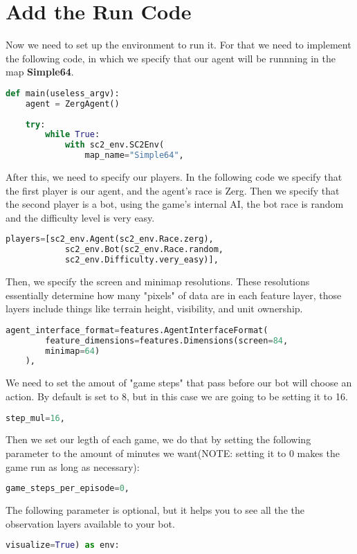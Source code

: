 \documentclass[11pt]{report}            %
\begin{document}
\section{Add the Run Code}
Now we need to set up the environment to run it. For that we need to implement the following code, in which we specify that our agent will be runnning in the map \textbf{Simple64}.
\begin{lstlisting}[language=Python]
    def main(useless_argv):
    agent = ZergAgent()
    
    try:
        while True:
            with sc2_env.SC2Env(
                map_name="Simple64",
\end{lstlisting}
After this, we need to specify our players. In the following code we specify that the first player is our agent, and the agent's race is Zerg. Then we specify that the second player is a bot, using the game's internal AI, the bot race is random and the difficulty level is very easy.
\begin{lstlisting}[language=Python]
    players=[sc2_env.Agent(sc2_env.Race.zerg),
            sc2_env.Bot(sc2_env.Race.random,
            sc2_env.Difficulty.very_easy)],
\end{lstlisting}
Then, we specify the screen and minimap resolutions. These resolutions essentially determine how many "pixels" of data are in each feature layer, those layers include things like terrain height, visibility, and unit ownership.
\begin{lstlisting}[language=Python]
    agent_interface_format=features.AgentInterfaceFormat(
        feature_dimensions=features.Dimensions(screen=84,
        minimap=64)
    ),
\end{lstlisting}
We need to set the amout of "game steps" that pass before our bot will choose an action. By default is set to 8, but in this case we are going to be setting it to 16.
\begin{lstlisting}[language=Python]
    step_mul=16,
\end{lstlisting}
Then we set our legth of each game, we do that by setting the following parameter to the amount of minutes we want(NOTE: setting it to 0 makes the game run as long as necessary):
\begin{lstlisting}[language=Python]
    game_steps_per_episode=0,
\end{lstlisting}
The following parameter is optional, but it helps you to see all the the observation layers available to your bot.
\begin{lstlisting}[language=Python]
    visualize=True) as env:
\end{lstlisting}
\end{document}
